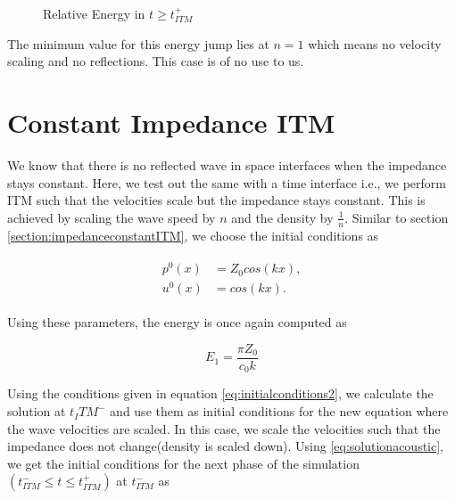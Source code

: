 \begin{figure}
    \centering
    \caption{Relative Energy in $t \geq t_{ITM}^+$}
    \label{fig:ratio2}
\end{figure}

The minimum value for this energy jump lies at $n=1$ which means no velocity scaling and no reflections. This case is of no use to us. 
\section{Constant Impedance \ac{ITM}}
We know that there is no reflected wave in space interfaces when the impedance stays constant. Here, we test out the same with a time interface i.e., we perform \ac{ITM} such that the velocities scale but the impedance stays constant. This is achieved by scaling the wave speed by $n$ and the density by $\frac{1}{n}$.
Similar to section \ref{section:impedanceconstantITM}, we choose the initial conditions as

\begin{align}
    \begin{split}
        p^0\left(x\right) &= Z_0cos\left(kx\right), \\
        u^0\left(x\right) &= cos\left(kx\right) .
    \end{split}
    \label{eq:initialconditions2}
\end{align}

Using these parameters, the energy is once again computed as

\begin{equation}
    E_1 = \frac{\pi Z_0}{c_0 k}
\end{equation}

Using the conditions given in equation \ref{eq:initialconditions2}, we calculate the solution at $t_ITM^-$ and use them as initial conditions for the new equation where the wave velocities are scaled.
In this case, we scale the velocities such that the impedance does not change(density is scaled down). Using \ref{eq:solutionacoustic}, we get the initial conditions for the next phase of the simulation$\left(t_{ITM}^- \leq t \leq t_{ITM}^+ \right)$ at $t_{ITM}^-$ as

